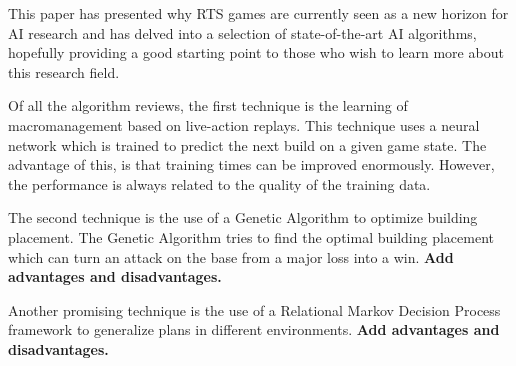 
This paper has presented why RTS games are currently seen as a new horizon for AI research and has delved into a selection of state-of-the-art AI algorithms, hopefully providing a good starting point to those who wish to learn more about this research field.



Of all the algorithm reviews, the first technique is the learning of macromanagement based on live-action replays. This technique uses a neural network which is trained to predict the next build  on a given game state. The advantage of this, is that training times can be improved enormously. However, the performance is always related to the quality of the training data. 

The second technique is the use of a Genetic Algorithm to optimize building placement. The Genetic Algorithm tries to find the optimal building placement which can turn an attack on the base from a major loss into a win. \textbf{Add advantages and disadvantages.}

Another promising technique is the use of a Relational Markov Decision Process framework to generalize plans in different environments. \textbf{Add advantages and disadvantages.}

